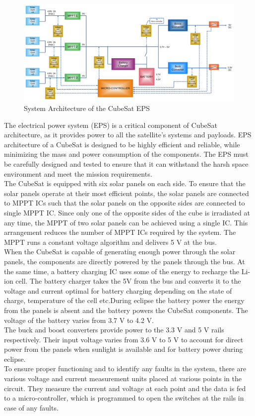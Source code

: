 \begin{figure}[h]
	\centering
	\includegraphics[width=\columnwidth]{IMGS/diag11.pdf}
	\caption{System Architecture of the CubeSat EPS}
	\label{fig:arch}
\end{figure} 
The electrical power system (EPS) is a critical component of CubeSat architecture, as it provides power to all the satellite's systems and payloads. EPS architecture of a CubeSat is designed to be highly efficient and reliable, while minimizing the mass and power consumption of the components. The EPS must be carefully designed and tested to ensure that it can withstand the harsh space environment and meet the mission requirements.\\


The CubeSat is equipped with six solar panels on each side. To ensure that the solar panels operate at their most efficient points, the solar panels are connected to MPPT ICs such that the solar panels on the opposite sides are connected to single MPPT IC. Since only one of the opposite sides of the cube is irradiated at any time, the MPPT of two solar panels can be achieved using a single IC. This arrangement reduces the number of MPPT ICs required by the system. The MPPT runs a constant voltage algorithm and delivers 5 V at the bus. 
\\

When the CubeSat is capable of generating enough power through the solar panels, the components are directly powered by the panels through the bus. At the same time, a battery charging IC uses some of the energy to recharge the Li-ion cell. The battery charger takes the 5V from the bus and converts it to the voltage and current optimal for battery charging depending on the state of charge, temperature of the cell etc.During eclipse the battery power the energy from the panels is absent and the battery powers the CubeSat components. The voltage of the battery varies from 3.7 V to 4.2 V.
\\

The buck and boost converters provide power to the 3.3 V and 5 V rails respectively. Their input voltage varies from 3.6 V to 5 V to account for direct power from the panels when sunlight is available and for battery power during eclipse.
\\

To ensure proper functioning and to identify any faults in the system, there are various voltage and current measurement units placed at various points in the circuit. They measure the current and voltage at each point and the data is fed to a micro-controller, which is programmed to open the switches at the rails in case of any faults.